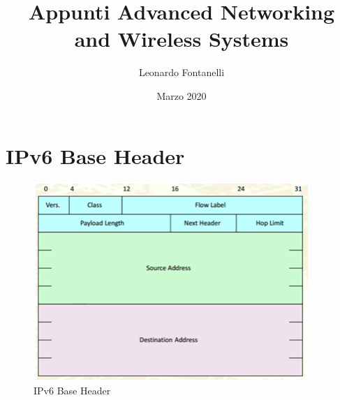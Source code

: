 \documentclass{article}
\title{Appunti Advanced Networking \\ and Wireless Systems}
\author{Leonardo Fontanelli}
\date{Marzo 2020}
\begin{document}
\maketitle

\section{IPv6 Base Header}

\begin{figure}[H]
\centering
\includegraphics[scale=0.5]{figures/base header.png}
\caption{IPv6 Base Header}
\end{figure}
\end{document}
